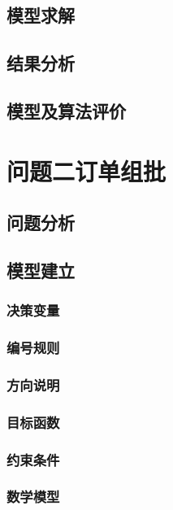\documentclass[bwprint]{gmcmthesis}
\begin{document}
\subsection{模型求解}

\subsection{结果分析}

\subsection{模型及算法评价}


\section{问题二订单组批}

\subsection{问题分析}

\subsection{模型建立}

\subsubsection{决策变量}

\subsubsection{编号规则}

\subsubsection{方向说明}

\subsubsection{目标函数}

\subsubsection{约束条件}

\subsubsection{数学模型}
\end{document}
